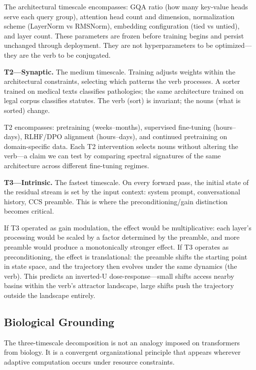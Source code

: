 \documentclass[12pt]{article}
\begin{document}
The architectural timescale encompasses: GQA ratio (how many key-value heads serve each query group), attention head count and dimension, normalization scheme (LayerNorm vs RMSNorm), embedding configuration (tied vs untied), and layer count. These parameters are frozen before training begins and persist unchanged through deployment. They are not hyperparameters to be optimized---they are the verb to be conjugated.

\textbf{T2---Synaptic.} The medium timescale. Training adjusts weights within the architectural constraints, selecting which patterns the verb processes. A sorter trained on medical texts classifies pathologies; the same architecture trained on legal corpus classifies statutes. The verb (sort) is invariant; the nouns (what is sorted) change.

T2 encompasses: pretraining (weeks--months), supervised fine-tuning (hours--days), RLHF/DPO alignment (hours--days), and continued pretraining on domain-specific data. Each T2 intervention selects nouns without altering the verb---a claim we can test by comparing spectral signatures of the same architecture across different fine-tuning regimes.

\textbf{T3---Intrinsic.} The fastest timescale. On every forward pass, the initial state of the residual stream is set by the input context: system prompt, conversational history, CCS preamble. This is where the preconditioning/gain distinction becomes critical.

If T3 operated as gain modulation, the effect would be multiplicative: each layer's processing would be scaled by a factor determined by the preamble, and more preamble would produce a monotonically stronger effect. If T3 operates as preconditioning, the effect is translational: the preamble shifts the starting point in state space, and the trajectory then evolves under the same dynamics (the verb). This predicts an inverted-U dose-response---small shifts access nearby basins within the verb's attractor landscape, large shifts push the trajectory outside the landscape entirely.

\subsection{Biological Grounding}

The three-timescale decomposition is not an analogy imposed on transformers from biology. It is a convergent organizational principle that appears wherever adaptive computation occurs under resource constraints.
\end{document}

